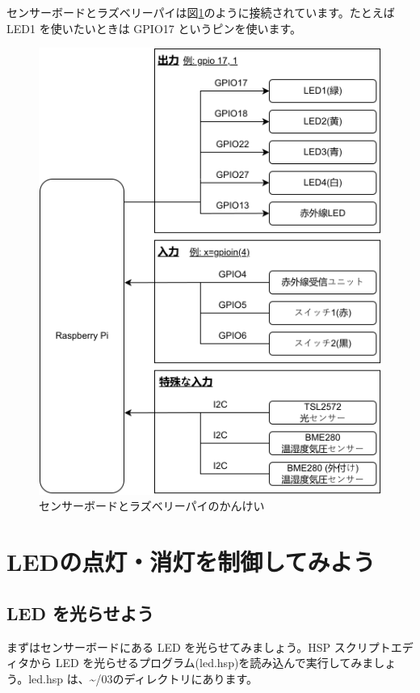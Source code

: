 センサーボードとラズベリーパイは図\ref{sensors}のように接続されています。たとえば LED1 を使いたいときは GPIO17 というピンを使います。

\begin{figure}[H]
    \centering
    \includegraphics[width=\linewidth]{images/chap03/text03-img031.png}
    \caption{センサーボードとラズベリーパイのかんけい}
    \label{sensors}
\end{figure}

\section{LEDの点灯・消灯を制御してみよう}
\subsection{LED を光らせよう}

まずはセンサーボードにある LED を光らせてみましょう。HSP スクリプトエディタから LED を光らせるプログラム(led.hsp)を読み込んで実行してみましょう。led.hsp は、\textasciitilde /03のディレクトリにあります。\\

